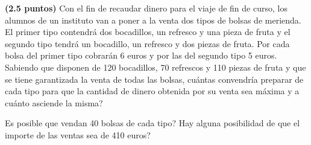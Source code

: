 
\textbf{(2.5 puntos)} Con el fin de recaudar dinero para el viaje de fin de
curso, los alumnos de un instituto van a poner a la venta dos tipos de bolsas
de merienda. El primer tipo contendrá dos bocadillos, un refresco y una pieza
de fruta y el segundo tipo tendrá un bocadillo, un refresco y dos piezas de
fruta. Por cada bolsa del primer tipo cobrarán 6 euros y por las del segundo
tipo 5 euros. Sabiendo que disponen de 120 bocadillos, 70 refrescos y 110
piezas de fruta y que se tiene garantizada la venta de todas las bolsas,
\textquestiondown{}cuántas convendría preparar de cada tipo para que la
cantidad de dinero obtenida por su venta sea máxima y a cuánto asciende la misma?

\textquestiondown{}Es posible que vendan 40 bolsas de cada tipo?
\textquestiondown{}Hay alguna posibilidad de que el importe de las ventas sea
de 410 euros?
